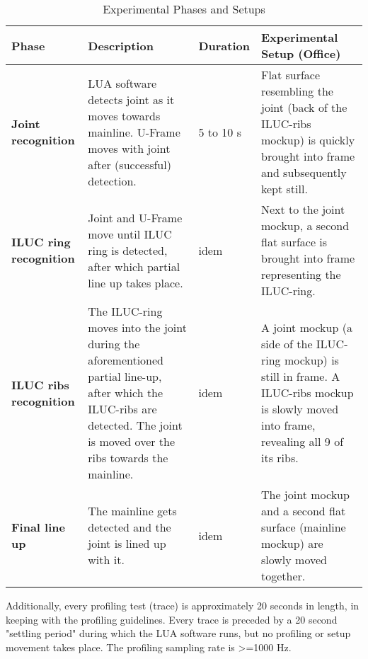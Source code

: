 \begin{table}[h!]
    \centering
    \begin{tabular}{|l|p{4cm}|p{2cm}|p{5cm}|}
        \hline
        \textbf{Phase}                    & \textbf{Description}                                                                                                                                                         & \textbf{Duration} & \textbf{Experimental Setup (Office)}                                                                                                           \\ \hline
        \textbf{Joint recognition}     & LUA software detects joint as it moves towards mainline. U-Frame moves with joint after (successful) detection.                                                              & 5 to 10 s         & Flat surface resembling the joint (back of the ILUC-ribs mockup) is quickly brought into frame and subsequently kept still.                    \\ \hline
        \textbf{ILUC ring recognition} & Joint and U-Frame move until ILUC ring is detected, after which partial line up takes place.                                                                                 & idem              & Next to the joint mockup, a second flat surface is brought into frame representing the ILUC-ring.                                              \\ \hline
        \textbf{ILUC ribs recognition} & The ILUC-ring moves into the joint during the aforementioned partial line-up, after which the ILUC-ribs are detected. The joint is moved over the ribs towards the mainline. & idem              & A joint mockup (a side of the ILUC-ring mockup) is still in frame. A ILUC-ribs mockup is slowly moved into frame, revealing all 9 of its ribs. \\ \hline
        \textbf{Final line up}         & The mainline gets detected and the joint is lined up with it.                                                                                                                & idem              & The joint mockup and a second flat surface (mainline mockup) are slowly moved together.                                                        \\ \hline
    \end{tabular}
    \caption{Experimental Phases and Setups}
    \label{table:experimental_phases}
\end{table}
Additionally, every profiling test (trace) is approximately 20 seconds in length, in keeping with the profiling guidelines. Every trace is preceded by a 20 second "settling period" during which the LUA software runs, but no profiling or setup movement takes place. The profiling sampling rate is >=1000 Hz.

